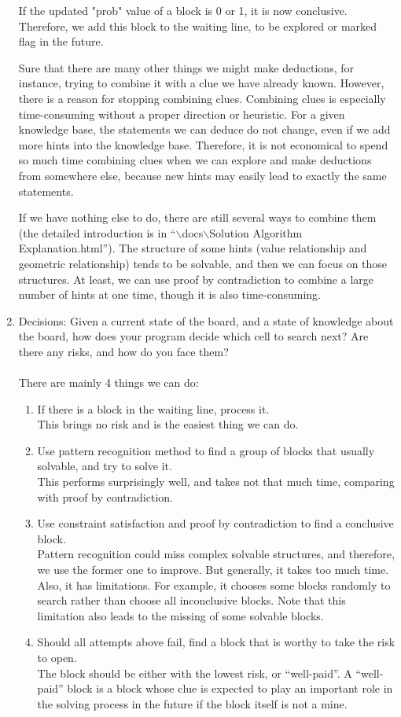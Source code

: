 \documentclass[letter]{article}
\begin{document}
\begin{enumerate}
	If the updated "prob" value of a block is 0 or 1, it is now conclusive. Therefore, we add this block to the waiting line, to be explored or marked flag in the future.
	
	Sure that there are many other things we might make deductions, for instance, trying to combine it with a clue we have already known. However, there is a reason for stopping combining clues. Combining clues is especially time-consuming without a proper direction or heuristic. For a given knowledge base, the statements we can deduce do not change, even if we add more hints into the knowledge base. Therefore, it is not economical to spend so much time combining clues when we can explore and make deductions from somewhere else, because new hints may easily lead to exactly the same statements.
	
	If we have nothing else to do, there are still several ways to combine them (the detailed introduction is in “$\backslash$docs$\backslash$Solution Algorithm Explanation.html”). The structure of some hints (value relationship and geometric relationship) tends to be solvable, and then we can focus on those structures. At least, we can use proof by contradiction to combine a large number of hints at one time, though it is also time-consuming.
	
	\item {Decisions: Given a current state of the board, and a state of knowledge about the board, how does your program decide which cell to search next? Are there any risks, and how do you face them?} \\
	\\
	There are mainly 4 things we can do:
	\begin{enumerate}
		\item {If there is a block in the waiting line, process it. \\ This brings no risk and is the easiest thing we can do.}
		\item {Use pattern recognition method to find a group of blocks that usually solvable, and try to solve it. \\ This performs surprisingly well, and takes not that much time, comparing with proof by contradiction.}
		\item {Use constraint satisfaction and proof by contradiction to find a conclusive block. \\ Pattern recognition could miss complex solvable structures, and therefore, we use the former one to improve. But generally, it takes too much time. Also, it has limitations. For example, it chooses some blocks randomly to search rather than choose all inconclusive blocks. Note that this limitation also leads to the missing of some solvable blocks.}
		\item {Should all attempts above fail, find a block that is worthy to take the risk to open. \\ The block should be either with the lowest risk, or “well-paid”. A “well-paid” block is a block whose clue is expected to play an important role in the solving process in the future if the block itself is not a mine.}
	\end{enumerate}
	

\end{enumerate}
\end{document}
